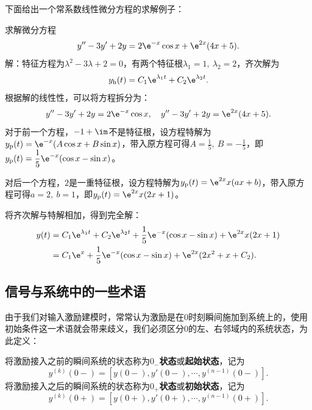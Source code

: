 下面给出一个常系数线性微分方程的求解例子：
\begin{example}
    求解微分方程
    \begin{equation}
        y''-3y'+2y=2\e^{-x}\cos x+\e^{2x}(4x+5).
    \end{equation}
    解：特征方程为$\lambda^2-3\lambda+2=0$，有两个特征根$\lambda_1=1,\ \lambda_2=2$，齐次解为
    \begin{equation}
        y_{\text{h}}(t)=C_1\e^{\lambda_1 t}+C_2\e^{\lambda_2 t}.
    \end{equation}
    根据解的线性性，可以将方程拆分为：
    \begin{equation}
        y''-3y'+2y=2\e^{-x}\cos x,\quad y''-3y'+2y=\e^{2x}(4x+5).
    \end{equation}
    对于前一个方程，$-1+\im$不是特征根，设方程特解为$y_{\text{p}}(t)=\e^{-x}(A\cos x+B\sin x)$，带入原方程可得$\displaystyle A=\frac{1}{5},\ B=-\frac{1}{5}$，即$\displaystyle y_{\text{p}}(t)=\frac{1}{5}\e^{-x}(\cos x-\sin x)$。

    对后一个方程，$2$是一重特征根，设方程特解为$y_{\text{p}}(t)=\e^{2x}x(ax+b)$，带入原方程可得$a=2,\ b=1$，即$y_{\text{p}}(t)=\e^{2x}x(2x+1)$。

    将齐次解与特解相加，得到完全解：
    \begin{align}
        y(t)&=C_1\e^{\lambda_1 t}+C_2\e^{\lambda_2 t}+\frac{1}{5}\e^{-x}(\cos x-\sin x)+\e^{2x}x(2x+1)\nonumber\\
        &=C_1 \e^{x}+\frac{1}{5}\e^{-x}(\cos x-\sin x)+\e^{2x}(2x^2+x+C_2).
    \end{align}
\end{example}

\subsection{信号与系统中的一些术语}\label{sub:term_in_ODE}

由于我们对输入激励建模时，常常认为激励是在$0$时刻瞬间施加到系统上的，使用初始条件这一术语就会带来歧义，我们必须区分$0$的左、右邻域内的系统状态，为此定义\cite{signal_systems}：
\begin{definition}[起始状态和初始状态]\label{def:initial_state}
    将激励接入之前的瞬间系统的状态称为\textbf{$0_-$状态}或\textbf{起始状态}，记为
    \begin{equation}
        y^{(k)}(0-)=[y(0-),y'(0-),\cdots,y^{(n-1)}(0-)].
    \end{equation}
    将激励接入之后的瞬间系统的状态称为\textbf{$0_+$状态}或\textbf{初始状态}，记为
    \begin{equation}
        y^{(k)}(0+)=[y(0+),y'(0+),\cdots,y^{(n-1)}(0+)].
    \end{equation}
\end{definition}

